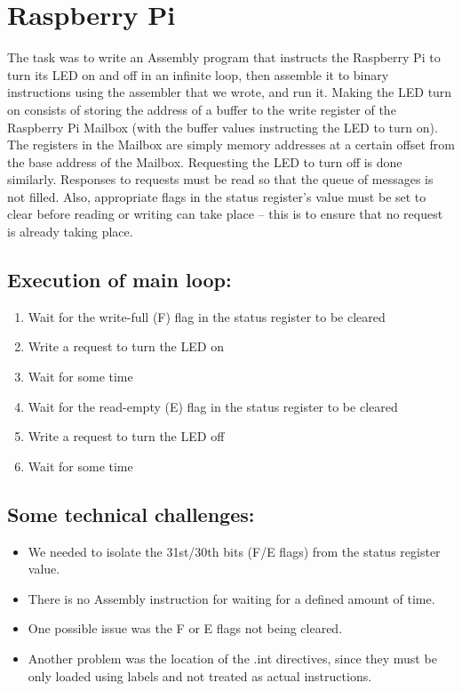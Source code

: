 \documentclass{article}
\begin{document}
\vspace{20pt}

\section{Raspberry Pi}

The task was to write an Assembly program that instructs the Raspberry Pi to turn its LED on and off in an infinite loop, then assemble it to binary instructions using the assembler that we wrote, and run it. Making the LED turn on consists of storing the address of a buffer to the write register of the Raspberry Pi Mailbox (with the buffer values instructing the LED to turn on). The registers in the Mailbox are simply memory addresses at a certain offset from the base address of the Mailbox. Requesting the LED to turn off is done similarly. Responses to requests must be read so that the queue of messages is not filled. Also, appropriate flags in the status register's value must be set to clear before reading or writing can take place – this is to ensure that no request is already taking place. 


\subsection{Execution of main loop:}
 

\begin{enumerate}
    \item Wait for the write-full (F) flag in the status register to be cleared
    \item Write a request to turn the LED on 
    \item Wait for some time
    \item Wait for the read-empty (E) flag in the status register to be cleared 
    \item Write a request to turn the LED off 
    \item Wait for some time 

\end{enumerate}

\subsection{Some technical challenges:}

\begin{itemize}
    \item We needed to isolate the 31st/30th bits (F/E flags) from the status register value.
    \item There is no Assembly instruction for waiting for a defined amount of time.
    \item One possible issue was the F or E flags not being cleared.
    \item Another problem was the location of the .int directives, since they must be only loaded using labels and not treated as actual instructions.
\end{itemize}
\end{document}
